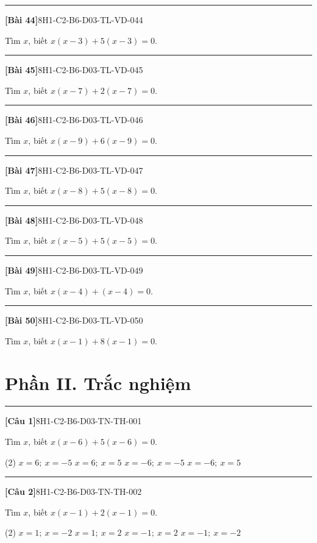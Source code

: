 \documentclass[12pt,a4paper]{article}
\newif\ifloigiai
\newenvironment{cauhoi}[2]{%
  \par\medskip\noindent\rule{\textwidth}{0.4pt}\par\nopagebreak
  \noindent\textbf{[#1]}\hfill{\scriptsize\ttfamily #2}\par\nopagebreak\smallskip}{\par}
\newcommand{\loigiai}[1]{\ifloigiai\par\smallskip\noindent\textit{Lời giải.} #1\par\fi}
\newcommand{\dapan}[1]{\ifloigiai\par\smallskip\noindent\textit{Đáp án:} \textbf{#1}\par\fi}
\begin{document}
\begin{cauhoi}{Bài 44}{8H1-C2-B6-D03-TL-VD-044}
Tìm $x$, biết $x(x-3)+5(x-3)=0$.
\loigiai{Đặt nhân tử chung: $(x-3)(x+5)=0$. Suy ra $x=3$ hoặc $x=-5$.}
\end{cauhoi}
\begin{cauhoi}{Bài 45}{8H1-C2-B6-D03-TL-VD-045}
Tìm $x$, biết $x(x-7)+2(x-7)=0$.
\loigiai{Đặt nhân tử chung: $(x-7)(x+2)=0$. Suy ra $x=7$ hoặc $x=-2$.}
\end{cauhoi}
\begin{cauhoi}{Bài 46}{8H1-C2-B6-D03-TL-VD-046}
Tìm $x$, biết $x(x-9)+6(x-9)=0$.
\loigiai{Đặt nhân tử chung: $(x-9)(x+6)=0$. Suy ra $x=9$ hoặc $x=-6$.}
\end{cauhoi}
\begin{cauhoi}{Bài 47}{8H1-C2-B6-D03-TL-VD-047}
Tìm $x$, biết $x(x-8)+5(x-8)=0$.
\loigiai{Đặt nhân tử chung: $(x-8)(x+5)=0$. Suy ra $x=8$ hoặc $x=-5$.}
\end{cauhoi}
\begin{cauhoi}{Bài 48}{8H1-C2-B6-D03-TL-VD-048}
Tìm $x$, biết $x(x-5)+5(x-5)=0$.
\loigiai{Đặt nhân tử chung: $(x-5)(x+5)=0$. Suy ra $x=5$ hoặc $x=-5$.}
\end{cauhoi}
\begin{cauhoi}{Bài 49}{8H1-C2-B6-D03-TL-VD-049}
Tìm $x$, biết $x(x-4)+(x-4)=0$.
\loigiai{Đặt nhân tử chung: $(x-4)(x+1)=0$. Suy ra $x=4$ hoặc $x=-1$.}
\end{cauhoi}
\begin{cauhoi}{Bài 50}{8H1-C2-B6-D03-TL-VD-050}
Tìm $x$, biết $x(x-1)+8(x-1)=0$.
\loigiai{Đặt nhân tử chung: $(x-1)(x+8)=0$. Suy ra $x=1$ hoặc $x=-8$.}
\end{cauhoi}
\clearpage\section*{Phần II. Trắc nghiệm}
\begin{cauhoi}{Câu 1}{8H1-C2-B6-D03-TN-TH-001}
Tìm $x$, biết $x(x-6)+5(x-6)=0$.
\begin{tasks}(2)
\task $x=6;\ x=-5$
\task $x=6;\ x=5$
\task $x=-6;\ x=-5$
\task $x=-6;\ x=5$
\end{tasks}
\dapan{A}
\end{cauhoi}
\begin{cauhoi}{Câu 2}{8H1-C2-B6-D03-TN-TH-002}
Tìm $x$, biết $x(x-1)+2(x-1)=0$.
\begin{tasks}(2)
\task $x=1;\ x=-2$
\task $x=1;\ x=2$
\task $x=-1;\ x=2$
\task $x=-1;\ x=-2$
\end{tasks}
\dapan{A}
\end{cauhoi}
\end{document}
